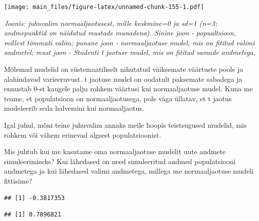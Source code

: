 \documentclass[]{book}
\newenvironment{Shaded}{\begin{snugshade}}{\end{snugshade}}
\newcommand{\KeywordTok}[1]{\textcolor[rgb]{0.13,0.29,0.53}{\textbf{#1}}}
\newcommand{\DataTypeTok}[1]{\textcolor[rgb]{0.13,0.29,0.53}{#1}}
\newcommand{\DecValTok}[1]{\textcolor[rgb]{0.00,0.00,0.81}{#1}}
\newcommand{\StringTok}[1]{\textcolor[rgb]{0.31,0.60,0.02}{#1}}
\newcommand{\CommentTok}[1]{\textcolor[rgb]{0.56,0.35,0.01}{\textit{#1}}}
\newcommand{\OperatorTok}[1]{\textcolor[rgb]{0.81,0.36,0.00}{\textbf{#1}}}
\newcommand{\NormalTok}[1]{#1}
\begin{document}
\texttt{[image: main\_files/figure-latex/unnamed-chunk-155-1.pdf]}

\emph{Joonis: juhuvalim normaaljaotusest, mille keskmine=0 ja sd=1 (n=3;
andmepunktid on näidatud mustade munadena). Sinine joon - popualtsioon,
millest tõmmati valim; punane joon - normaaljaotuse mudel, mis on
fititud valimi andmetel; must joon - Studenti t jaotuse mudel, mis on
fititud samade andmetega.}

Mõlemad mudelid on süstemaatiliselt nihutatud väiksemate väärtuste poole
ja alahindavad varieeruvust. t jaotuse mudel on oodatult paksemate
sabadega ja ennustab 0-st kaugele palju rohkem väärtusi kui
normaaljaotuse mudel. Kuna me teame, et populatsioon on
normaaljaotusega, pole väga üllatav, et t jaotus modeleerib seda
halvemini kui normaaljaotus.

Igal juhul, mõni teine juhuvalim annaks meile hoopis teistsugused
mudelid, mis rohkem või vähem erinevad algsest populatsioonist.

Mis juhtub kui me kasutame oma normaaljaotuse mudelit uute andmete
simuleerimiseks? Kui lähedased on need simuleeritud andmed populatsiooni
andmetega ja kui lähedased valimi andmetega, millega me normaaljaotuse
mudeli fittisime?

\begin{Shaded}
\end{Shaded}

\begin{verbatim}
## [1] -0.3817353
\end{verbatim}

\begin{verbatim}
## [1] 0.7896821
\end{verbatim}

\begin{Shaded}
\end{Shaded}
\end{document}
